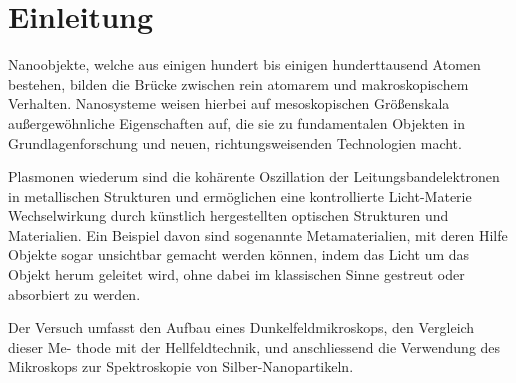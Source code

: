 
\chapter{Einleitung}
\label{chap:einleitung}

Nanoobjekte, welche aus einigen hundert bis einigen hunderttausend Atomen bestehen,
bilden die Brücke zwischen rein atomarem und makroskopischem Verhalten. Nanosysteme weisen hierbei auf mesoskopischen Größenskala außergewöhnliche Eigenschaften auf, die sie zu fundamentalen Objekten in Grundlagenforschung und neuen, richtungsweisenden Technologien macht.

Plasmonen wiederum sind die kohärente Oszillation der Leitungsbandelektronen in metallischen Strukturen und ermöglichen eine kontrollierte Licht-Materie Wechselwirkung durch künstlich hergestellten optischen Strukturen und Materialien. Ein Beispiel davon sind sogenannte Metamaterialien, mit deren Hilfe Objekte sogar
unsichtbar gemacht werden können, indem das Licht um das Objekt herum geleitet wird,
ohne dabei im klassischen Sinne gestreut oder absorbiert zu werden. 

Der Versuch umfasst den Aufbau eines Dunkelfeldmikroskops, den Vergleich dieser Me-
thode mit der Hellfeldtechnik, und anschliessend die Verwendung des Mikroskops zur
Spektroskopie von Silber-Nanopartikeln. \cite{Anleitung}